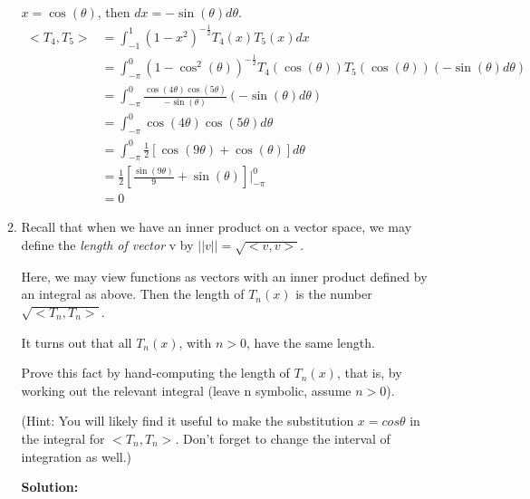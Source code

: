 \documentclass[conference,onecolumn]{IEEEtran}
\begin{document}
\begin{enumerate}[label=\arabic{enumi}.]
\begin{enumerate}
                        $x = \cos(\theta)$, then $dx = -\sin(\theta) d\theta$.
                        \begin{align*}
                              < T_4, T_5 > & = \int_{-1}^{1} (1 - x^2)^{-\frac{1}{2}} T_4(x) T_5(x) dx                                                         \\
                                           & = \int_{-\pi}^{0} (1 - \cos^2(\theta))^{-\frac{1}{2}} T_4(\cos(\theta)) T_5(\cos(\theta)) (- \sin(\theta)d\theta) \\
                                           & = \int_{-\pi}^{0} \frac{\cos(4\theta) \cos(5\theta)}{- \sin(\theta)} (- \sin(\theta)d\theta)                      \\
                                           & = \int_{-\pi}^{0} \cos(4\theta) \cos(5\theta) d\theta                                                             \\
                                           & = \int_{-\pi}^{0} \frac{1}{2} \left[ \cos(9\theta) + \cos(\theta) \right] d\theta                                 \\
                                           & = \frac{1}{2} \left[ \frac{\sin(9\theta)}{9} + \sin(\theta) \right] \rvert_{-\pi}^{0}                             \\
                                           & = 0
                        \end{align*}
                  \item Recall that when we have an inner product on a vector space, we may define the \textit{length of vector} v by $||v|| = \sqrt{< v, v >}$.

                        Here, we may view functions as vectors with an inner product defined by an integral
                        as above.
                        Then the length of $T_n(x)$ is the number $\sqrt{< T_n, T_n >}$.

                        It turns out that all $T_n(x)$, with $n > 0$, have the same length.

                        Prove this fact by hand-computing the length of $T_n(x)$, that is, by working out the relevant integral (leave n symbolic, assume $n > 0$).

                        (Hint: You will likely find it useful to make the substitution $x = cos \theta$ in the integral for $< T_n, T_n >$. Don't forget to change the interval of integration as well.)

                        \textbf{Solution:}


\end{enumerate}
\end{enumerate}
\end{document}
